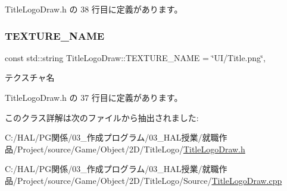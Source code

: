  Title\+Logo\+Draw.\+h の 38 行目に定義があります。

\mbox{\label{class_title_logo_draw_a663026976213673c6bcc66533b89ffa1}} 
\subsubsection{\texorpdfstring{T\+E\+X\+T\+U\+R\+E\+\_\+\+N\+A\+ME}{TEXTURE\_NAME}}
{\footnotesize\ttfamily const std\+::string Title\+Logo\+Draw\+::\+T\+E\+X\+T\+U\+R\+E\+\_\+\+N\+A\+ME = \char`\"{}UI/Title.\+png\char`\"{}\hspace{0.3cm}{\ttfamily [static]}, {\ttfamily [private]}}



テクスチャ名 



 Title\+Logo\+Draw.\+h の 37 行目に定義があります。



このクラス詳解は次のファイルから抽出されました\+:\begin{DoxyCompactItemize}
\item 
C\+:/\+H\+A\+L/\+P\+G関係/03\+\_\+作成プログラム/03\+\_\+\+H\+A\+L授業/就職作品/\+Project/source/\+Game/\+Object/2\+D/\+Title\+Logo/\mbox{\hyperlink{_title_logo_draw_8h}{Title\+Logo\+Draw.\+h}}\item 
C\+:/\+H\+A\+L/\+P\+G関係/03\+\_\+作成プログラム/03\+\_\+\+H\+A\+L授業/就職作品/\+Project/source/\+Game/\+Object/2\+D/\+Title\+Logo/\+Source/\mbox{\hyperlink{_title_logo_draw_8cpp}{Title\+Logo\+Draw.\+cpp}}\end{DoxyCompactItemize}
